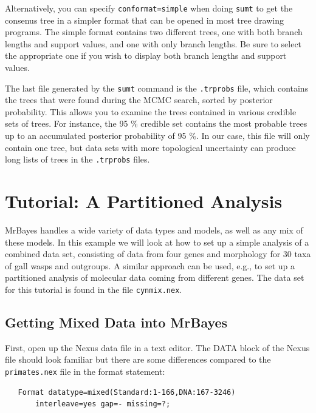 \documentclass[12pt]{book}
\begin{document}
Alternatively, you can specify \texttt{conformat=simple} when doing \texttt{sumt} to get the
consenus tree in a simpler format that can be opened in most tree drawing programs. The simple
format contains two different trees, one with both branch lengths and support values, and one with
only branch lengths.  Be sure to select the appropriate one if you wish to display both branch
lengths and support values.

The last file generated by the \texttt{sumt} command is the \texttt{.trprobs} file, which contains
the trees that were found during the MCMC search, sorted by posterior probability. This allows you
to examine the trees contained in various credible sets of trees. For instance, the 95 \% credible
set contains the most probable trees up to an accumulated posterior probability of 95 \%. In our
case, this file will only contain one tree, but data sets with more topological uncertainty can
produce long lists of trees in the \texttt{.trprobs} files.

\chapter{Tutorial: A Partitioned Analysis}
\label{tutorialPartitioned}
MrBayes handles a wide variety of data types and models, as well as any mix of these models. In
this example we will look at how to set up a simple analysis of a combined data set, consisting of
data from four genes and morphology for 30 taxa of gall wasps and outgroups. A similar approach can
be used, e.g., to set up a partitioned analysis of molecular data coming from different genes. The
data set for this tutorial is found in the file \texttt{cynmix.nex}.

\section{Getting Mixed Data into MrBayes}

First, open up the Nexus data file in a text editor. The DATA block of the Nexus file should look
familiar but there are some differences compared to the \texttt{primates.nex} file in the format
statement:

\begin{singlespacing}
\small
\begin{verbatim}
   Format datatype=mixed(Standard:1-166,DNA:167-3246)
       interleave=yes gap=- missing=?;
\end{verbatim}
\normalsize
\end{singlespacing}
\end{document}
